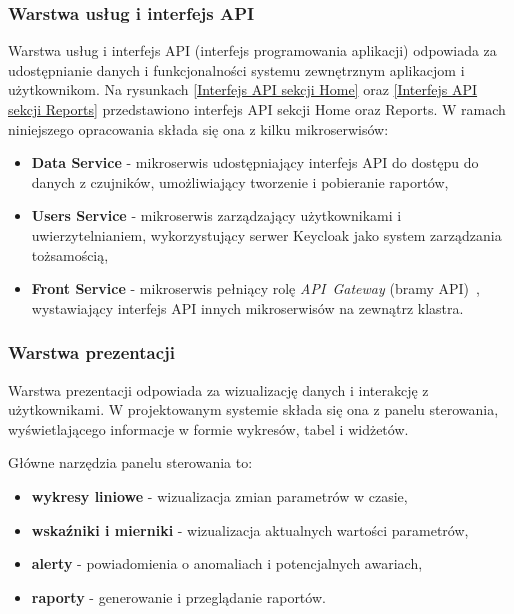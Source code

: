 \subsubsection{Warstwa usług i interfejs API}
\label{subsubsec:warstwa_uslug}

Warstwa usług i interfejs API (interfejs programowania aplikacji) odpowiada za udostępnianie danych i funkcjonalności systemu zewnętrznym aplikacjom i użytkownikom. Na rysunkach \ref{Interfejs API sekcji Home} oraz \ref{Interfejs API sekcji Reports} przedstawiono interfejs API sekcji Home oraz Reports. W ramach niniejszego opracowania składa się ona z kilku mikroserwisów:

\begin{itemize}
    \item \textbf{Data Service} - mikroserwis udostępniający interfejs API do dostępu do danych z czujników, umożliwiający tworzenie i pobieranie raportów,
    \item \textbf{Users Service} - mikroserwis zarządzający użytkownikami i uwierzytelnianiem, wykorzystujący serwer Keycloak jako system zarządzania tożsamością,
    \item \textbf{Front Service} - mikroserwis pełniący rolę \mbox{\textit{API Gateway}} (bramy API)~\cite{api_gateway_definition}, wystawiający interfejs API innych mikroserwisów na zewnątrz klastra.
\end{itemize}


\subsubsection{Warstwa prezentacji}
\label{subsubsec:warstwa_prezentacji}

Warstwa prezentacji odpowiada za wizualizację danych i interakcję z użytkownikami.
W projektowanym systemie składa się ona z panelu sterowania, wyświetlającego informacje w formie wykresów, tabel i widżetów.

\vspace{0.3em}

Główne narzędzia panelu sterowania to:

\begin{itemize}
    \item \textbf{wykresy liniowe} - wizualizacja zmian parametrów w czasie,
    \item \textbf{wskaźniki i mierniki} - wizualizacja aktualnych wartości parametrów,
    \item \textbf{alerty} - powiadomienia o anomaliach i potencjalnych awariach,
    \item \textbf{raporty} - generowanie i przeglądanie raportów.
\end{itemize}

